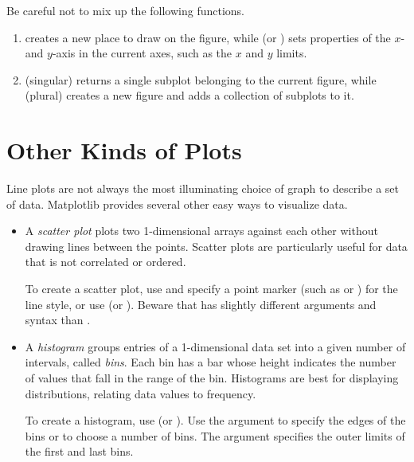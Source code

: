 \begin{warn}
Be careful not to mix up the following functions.
\begin{enumerate}
    \item {} creates a new place to draw on the figure, while  (or ) sets properties of the $x$- and $y$-axis in the current axes, such as the $x$ and $y$ limits.
    \item {} (singular) returns a single subplot belonging to the current figure, while  (plural) creates a new figure and adds a collection of subplots to it.
\end{enumerate}
\end{warn}

\section*{Other Kinds of Plots} %

Line plots are not always the most illuminating choice of graph to describe a set of data.
Matplotlib provides several other easy ways to visualize data.

\begin{itemize}
\item A \emph{scatter plot} plots two 1-dimensional arrays against each other without drawing lines between the points.
Scatter plots are particularly useful for data that is not correlated or ordered.

To create a scatter plot, use  and specify a point marker (such as  or ) for the line style, or use  (or ).
Beware that  has slightly different arguments and syntax than .

\item A \emph{histogram} groups entries of a 1-dimensional data set into a given number of intervals, called \emph{bins}.
Each bin has a bar whose height indicates the number of values that fall in the range of the bin.
Histograms are best for displaying distributions, relating data values to frequency.

To create a histogram, use  (or ).
Use the argument  to specify the edges of the bins or to choose a number of bins.
The  argument specifies the outer limits of the first and last bins.
\end{itemize}

